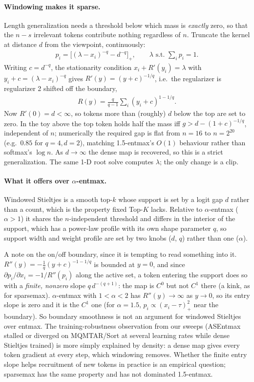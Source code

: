 \documentclass{article}
\begin{document}
\paragraph{Windowing makes it sparse.} Length generalization needs a threshold below which mass is
\emph{exactly} zero, so that the $n - s$ irrelevant tokens contribute nothing regardless of $n$.
Truncate the kernel at distance $d$ from the viewpoint, continuously:
\begin{align*}
p_i = \Big[ (\lambda - x_i)^{-q} - d^{-q} \Big]_+ , \qquad \lambda \text{ s.t. } \textstyle\sum_i p_i = 1 .
\end{align*}
Writing $c = d^{-q}$, the stationarity condition $x_i + R'(y_i) = \lambda$ with $y_i + c = (\lambda -
x_i)^{-q}$ gives $R'(y) = (y + c)^{-1/q}$, i.e.\ the regularizer is regularizer 2 shifted off the
boundary,
\begin{align*}
R(y) = \frac{q}{q-1} \sum_i (y_i + c)^{1 - 1/q}.
\end{align*}
Now $R'(0) = d < \infty$, so tokens more than (roughly) $d$ below the top are set to zero. In the toy
above the top token holds half the mass iff $g > d - (1+c)^{-1/q}$, independent of $n$; numerically
the required gap is flat from $n = 16$ to $n = 2^{20}$ (e.g.\ $0.85$ for $q = 4, d = 2$), matching
1.5-entmax's $O(1)$ behaviour rather than softmax's $\log n$. As $d \to \infty$ the dense map is
recovered, so this is a strict generalization. The same 1-D root solve computes $\lambda$; the only
change is a clip.

\paragraph{What it offers over $\alpha$-entmax.} Windowed Stieltjes is a smooth top-$k$ whose support
is set by a logit gap $d$ rather than a count, which is the property fixed Top-$K$ lacks. Relative
to $\alpha$-entmax ($\alpha > 1$) it shares the $n$-independent threshold and differs in the interior
of the support, which has a power-law profile with its own shape parameter $q$, so support width and
weight profile are set by two knobs ($d$, $q$) rather than one ($\alpha$).

A note on the on/off boundary, since it is tempting to read something into it. $R''(y) =
-\tfrac{1}{q}(y+c)^{-1-1/q}$ is bounded at $y = 0$, and since $\partial p_i/\partial x_i = -1/R''(p_i)$
along the active set, a token entering the support does so with a \emph{finite, nonzero} slope
$q\,d^{-(q+1)}$: the map is $C^0$ but not $C^1$ there (a kink, as for sparsemax). $\alpha$-entmax with
$1 < \alpha < 2$ has $R''(y) \to \infty$ as $y \to 0$, so its entry slope is zero and it is the
$C^1$ one (for $\alpha = 1.5$, $p_i \propto (x_i - \tau)_+^2$ near the boundary). So boundary smoothness is
not an argument for windowed Stieltjes over entmax. The training-robustness observation from our
sweeps (ASEntmax stalled or diverged on MQMTAR/Sort at several learning rates while dense Stieltjes
trained) is more simply explained by density: a dense map gives every token gradient at every step,
which windowing removes. Whether the finite entry slope helps recruitment of new tokens in practice
is an empirical question; sparsemax has the same property and has not dominated 1.5-entmax.
\end{document}
